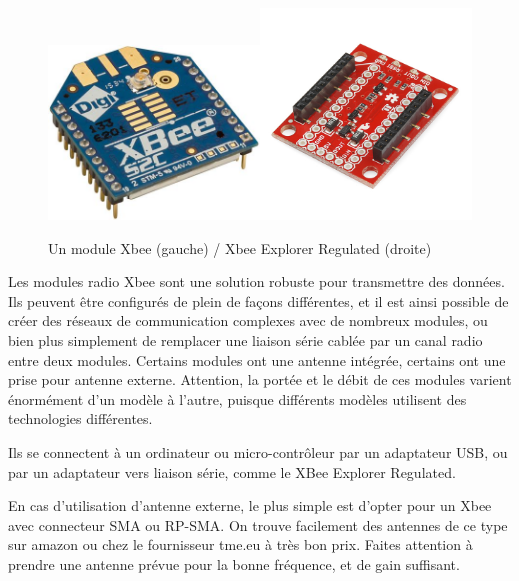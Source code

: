 \documentclass[a4paper, 11pt]{report}
\begin{document}
\begin{figure}[h]
\caption{Un module Xbee (gauche) / Xbee Explorer Regulated (droite)}

\begin{centering}
\includegraphics[width=0.5\textwidth]{images/xbee}\includegraphics[width=0.5\textwidth]{images/xbee_explorer_regulated.jpg}
\par\end{centering}
\end{figure}

Les modules radio Xbee sont une solution robuste pour transmettre
des données. Ils peuvent être configurés de plein de façons différentes,
et il est ainsi possible de créer des réseaux de communication complexes
avec de nombreux modules, ou bien plus simplement de remplacer une
liaison série cablée par un canal radio entre deux modules. Certains
modules ont une antenne intégrée, certains ont une prise pour antenne
externe. Attention, la portée et le débit de ces modules varient énormément
d'un modèle à l'autre, puisque différents modèles utilisent des technologies
différentes.

Ils se connectent à un ordinateur ou micro-contrôleur par un adaptateur
USB, ou par un adaptateur vers liaison série, comme le XBee Explorer
Regulated.

En cas d'utilisation d'antenne externe, le plus simple est d'opter
pour un Xbee avec connecteur SMA ou RP-SMA. On trouve facilement des
antennes de ce type sur amazon ou chez le fournisseur tme.eu à très
bon prix. Faites attention à prendre une antenne prévue pour la bonne
fréquence, et de gain suffisant.
\end{document}
